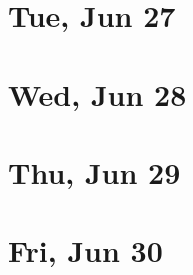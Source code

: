 	\section{Tue, Jun 27}
		
		
	\section{Wed, Jun 28}
		
		
	\section{Thu, Jun 29}
		
		
	\section{Fri, Jun 30}
		
		
